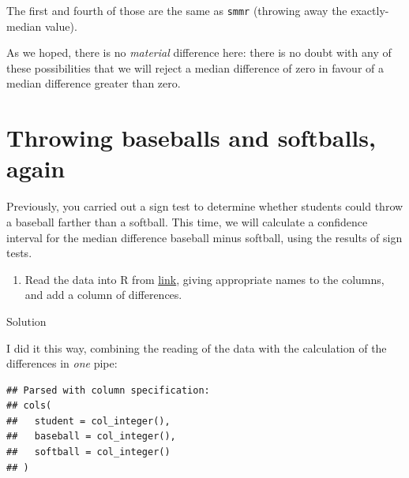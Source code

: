 \documentclass[]{tufte-book}
\newenvironment{Shaded}{}{}
\newcommand{\DataTypeTok}[1]{\textcolor[rgb]{0.56,0.13,0.00}{#1}}
\newcommand{\KeywordTok}[1]{\textcolor[rgb]{0.00,0.44,0.13}{\textbf{#1}}}
\newcommand{\NormalTok}[1]{#1}
\newcommand{\OperatorTok}[1]{\textcolor[rgb]{0.40,0.40,0.40}{#1}}
\newcommand{\StringTok}[1]{\textcolor[rgb]{0.25,0.44,0.63}{#1}}
\providecommand{\tightlist}{%
  \setlength{\itemsep}{0pt}\setlength{\parskip}{0pt}}
\theoremstyle{definition}
\theoremstyle{definition}
\theoremstyle{definition}
\theoremstyle{remark}
\begin{document}
The first and fourth of those are the same as \texttt{smmr} (throwing
away the exactly-median value).

As we hoped, there is no \emph{material} difference here: there is no
doubt with any of these possibilities that we will reject a median
difference of zero in favour of a median difference greater than zero.

\hypertarget{throwing-baseballs-and-softballs-again}{%
\section{Throwing baseballs and softballs,
again}\label{throwing-baseballs-and-softballs-again}}

Previously, you carried out a sign test to determine whether students
could throw a baseball farther than a softball. This time, we will
calculate a confidence interval for the median difference baseball minus
softball, using the results of sign tests.

\begin{enumerate}
\def\labelenumi{(\alph{enumi})}
\tightlist
\item
  Read the data into R from
  \href{http://www.utsc.utoronto.ca/~butler/c32/throw.txt}{link}, giving
  appropriate names to the columns, and add a column of differences.
\end{enumerate}

Solution

I did it this way, combining the reading of the data with the
calculation of the differences in \emph{one} pipe:

\begin{Shaded}
\end{Shaded}

\begin{verbatim}
## Parsed with column specification:
## cols(
##   student = col_integer(),
##   baseball = col_integer(),
##   softball = col_integer()
## )
\end{verbatim}
\end{document}

